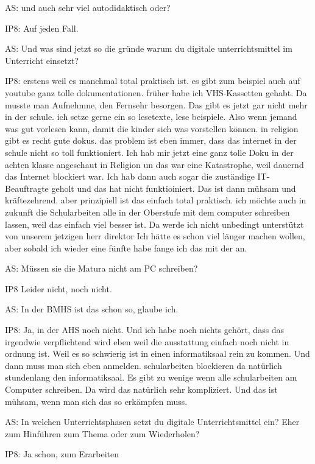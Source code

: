\documentclass[fontsize=11pt,paper=a4]{scrbook}
\begin{document}
{\begin{itemize*}
		\item[AS:] und	auch sehr viel autodidaktisch oder?
		\item[IP8:] Auf jeden Fall.
		\item[AS:] Und was
		sind jetzt so die gründe warum du
		digitale unterrichtsmittel im Unterricht einsetzt?
		\item[IP8:] erstens weil es
		manchmal total praktisch ist. es gibt zum
		beispiel auch auf youtube ganz tolle
		dokumentationen.
		früher habe ich VHS-Kassetten gehabt. Da musste man Aufnehmne, den Fernsehr besorgen. Das gibt es jetzt gar nicht mehr in
		der schule.
		ich setze gerne ein so lesetexte, lese
		beispiele. Also wenn jemand was gut
		vorlesen kann, damit die kinder sich was
		vorstellen können.
		in religion gibt es recht gute dokus.
		das problem ist eben immer, dass das
		internet in der schule nicht so toll funktioniert. Ich hab mir jetzt eine ganz tolle Doku in der achten
		klasse angeschaut in Religion un das war eine Katastrophe, weil dauernd das Internet blockiert war. Ich hab dann auch sogar die
		zuständige IT-Beauftragte geholt und das hat nicht funktioiniert. Das ist dann mühsam und kräftezehrend.
		aber prinzipiell ist das einfach total
		praktisch. ich möchte auch in zukunft die Schularbeiten alle in der Oberstufe mit dem 
		computer schreiben lassen, weil das
		einfach viel besser ist. Da werde ich
		nicht unbedingt unterstützt von unserem
		jetzigen herr direktor Ich hätte es schon viel länger machen
		wollen, aber sobald ich wieder eine
		fünfte habe fange ich das mit der an.
		\item[AS:] Müssen sie die Matura nicht am PC schreiben?
		\item[IP8] Leider nicht, noch nicht.
		\item[AS:] In der BMHS ist das schon so, glaube ich.
		\item[IP8:] Ja, in der AHS noch nicht. Und ich habe noch nichts gehört, dass das
		irgendwie verpflichtend wird eben weil
		die ausstattung einfach noch nicht in
		ordnung ist. Weil es so schwierig ist in einen informatiksaal rein zu kommen. Und
		dann muss man sich eben anmelden.
		schularbeiten blockieren da natürlich
		stundenlang den informatiksaal. Es gibt
		zu wenige wenn alle schularbeiten am Computer schreiben. Da wird das natürlich
		sehr kompliziert. Und das ist mühsam, wenn
		man sich das so erkämpfen muss.
		\item[AS:] In welchen
		Unterrichtsphasen setzt du digitale Unterrichtsmittel ein? Eher zum Hinführen zum Thema oder zum
		Wiederholen?
		\item[IP8:] Ja schon, zum Erarbeiten

\end{itemize*}}
\end{document}
